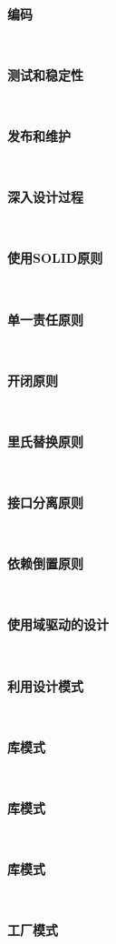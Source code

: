 \noindent\textbf{}\ \par
\textbf{编码} \ \par

\noindent\textbf{}\ \par
\textbf{测试和稳定性} \ \par

\noindent\textbf{}\ \par
\textbf{发布和维护} \ \par

\noindent\textbf{}\ \par
\textbf{深入设计过程} \ \par

\noindent\textbf{}\ \par
\textbf{使用SOLID原则} \ \par

\noindent\textbf{}\ \par
\textbf{单一责任原则} \ \par

\noindent\textbf{}\ \par
\textbf{开闭原则} \ \par

\noindent\textbf{}\ \par
\textbf{里氏替换原则} \ \par

\noindent\textbf{}\ \par
\textbf{接口分离原则} \ \par

\noindent\textbf{}\ \par
\textbf{依赖倒置原则} \ \par

\noindent\textbf{}\ \par
\textbf{使用域驱动的设计} \ \par

\noindent\textbf{}\ \par
\textbf{利用设计模式} \ \par

\noindent\textbf{}\ \par
\textbf{库模式} \ \par

\noindent\textbf{}\ \par
\textbf{库模式} \ \par

\noindent\textbf{}\ \par
\textbf{库模式} \ \par

\noindent\textbf{}\ \par
\textbf{工厂模式} \ \par

